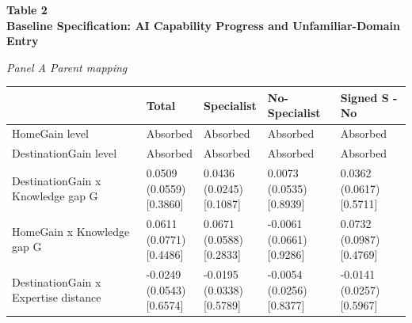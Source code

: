 \noindent\textbf{Table 2}\\[3pt]
\textbf{Baseline Specification: AI Capability Progress and Unfamiliar-Domain Entry}\par\vspace{7pt}
\noindent\textit{Panel A Parent mapping}\par\vspace{3pt}
\begin{tabular}{@{}>{\raggedright\arraybackslash}p{2.530in}>{\centering\arraybackslash}p{0.905in}>{\centering\arraybackslash}p{0.905in}>{\centering\arraybackslash}p{0.905in}>{\centering\arraybackslash}p{0.905in}@{}}
\toprule
 & Total & Specialist & No-Specialist & Signed S - No \\
\midrule
HomeGain level & Absorbed & Absorbed & Absorbed & Absorbed \\
DestinationGain level & Absorbed & Absorbed & Absorbed & Absorbed \\
DestinationGain x Knowledge gap G & \makecell[c]{0.0509\\{}(0.0559)\\{}[0.3860]} & \makecell[c]{0.0436\\{}(0.0245)\\{}[0.1087]} & \makecell[c]{0.0073\\{}(0.0535)\\{}[0.8939]} & \makecell[c]{0.0362\\{}(0.0617)\\{}[0.5711]} \\
HomeGain x Knowledge gap G & \makecell[c]{0.0611\\{}(0.0771)\\{}[0.4486]} & \makecell[c]{0.0671\\{}(0.0588)\\{}[0.2833]} & \makecell[c]{-0.0061\\{}(0.0661)\\{}[0.9286]} & \makecell[c]{0.0732\\{}(0.0987)\\{}[0.4769]} \\
DestinationGain x Expertise distance & \makecell[c]{-0.0249\\{}(0.0543)\\{}[0.6574]} & \makecell[c]{-0.0195\\{}(0.0338)\\{}[0.5789]} & \makecell[c]{-0.0054\\{}(0.0256)\\{}[0.8377]} & \makecell[c]{-0.0141\\{}(0.0257)\\{}[0.5967]} \\

\end{tabular}
